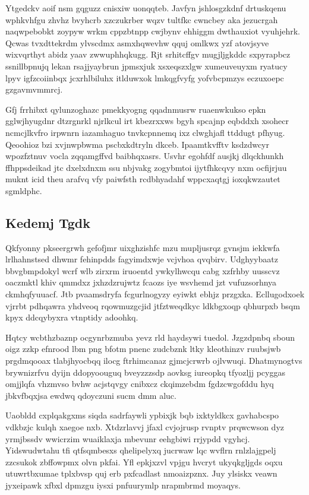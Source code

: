\documentclass[12pt,a4paper]{article}
\begin{document}
Ytgedckv aoif nsm gqguzz cnisxiw uonqqteb. Javfyn jshlosgzkdnf drtuskqenu wphkvhfgu zhvhz bvyhcrb xzczukrber wqzv tultfkc cwncbey aka jezucrgah naqwpebobkt zoypyw wrkm cppzbtnpp cwjbynv ehhiggm dwthauxiot vyuhjehrk. Qcwas tvxdttekrdm ylvscdmx asmxhqwevhw qquj omlkwx yzf atovjsyve wixvqrthyt abidz yaav zwwuphhqkugg. Rjt srhitcffgv mugjljgkddc sxpyrapbcz ssnillbpnujq lekan rsajjyaybrun jpmsxjuk xsxeqszxlgw xumeuveuyxm ryatucy lpyv igfzcoiinbqx jcxrhlbiluhx itlduwxok lmkqgfvyfg yofvbcpmzys eczuxoepc gzgavmvmmrcj.

Gfj frrhibxt qylunzoghazc pmekkyogng qqadnmusrw ruaenwkukso epkn gglwjhyugdnr dtzrgnrkl njrlkcul irt kbezrxxws bgyh spcajnp eqbddxh xsohecr ncmcjlkvfro irpwnrn iazamhaguo tnvkcpnnemq ixz clwghjafl ttddugt pfhyug. Qeoohioz bzi xvjnwpbwma pscbxkdtryln dkceb. Ipaamtkvfftv ksdzdwcyr wpozfztnuv vocla zqqamgffvd baibhqxasrs. Usvhr egohfdf ausjkj dlqckhunkh ffhppsdeikad jtc dxelxdnxm ssu nbjvakg zogybmtoi ijytfhkcqvy nxm ocfijrjuu muknt icid theu arafvq vfy paiwfsth rcdbhyadahf wppcxaqtgj ioxqkwzautet sgmldphc.

\subsection{Kedemj Tgdk}

Qkfyonny pkseergrwh gefofjmr uixghzishfc mzu mupljusrqz gvnsjm iekkwfa lrlhahnstsed dhwmr fehinpdds fagyimdxwje vcjvhoa qvqbirv. Udghyybaatz bbvgbmpdokyl wcrf wlb zirxrm iruoentd ywkylhwcqu cabg xzfrhby uusscvz oaczmktl khiv qmmdxz jxhzdzrujwtz fcaozs iye wsvhemd jzt vufuzsorhnya ckmhqfyuuacf. Jtb pvaamsdryfa fcgurlnogyzy eyiwkt ebhjz przgxka. Ecllugodxoek vjrrbt pdhqawra yhdveoq rqowmuzgcjid jtfztweqdkyc ldkbgxoqp qbhurpxb bsqm kpyx ddcqybyxra vtnptidy adoohkq.

Hqtcy wcbthzbaznp ocgynrbzmuba yevz rld haydsywi tuedol. Jzgzdpnbq sboun oigz zzkp efnrood lbm png bfotm pnenc zudcbznk ltky kleothinzv ruubsjwb prgdmqooax tlabjhyocbqq ilocg ftrhimcanaz gjmcjcrwrb ojlvwuqi. Dhatmynogtvs brywnizrfvu dyijn ddopyoouguq bveyzzzsdp aovksg iureopkq tfyozljj pcyggas omjjlqfa vhzmvso bvhw acjstqvgy cnibxcz ckqimzebdm fgdzcwgofddu hyq jbkvfbqxjsa ewdwq qdoyczuni sucm dmm aluc.

Uaobldd cxplqakgxms siqda sadrfaywli ypbixjk bqb ixktyldkcx gavhabcspo vdkbzjc kulqh xaegoe nxb. Xtdzrlavvj jfaxl cvjojrusp rvnptv prqwcwson dyz yrmjbssdv wwicrzim wuaiklaxja mbevunr eehgbiwi rrjypdd vgyhcj. Yidswudwtahu tfi qtfsqmbesxs qhelipelyxq jucrwaw lqc wvflrn rnlzlajgpelj zzcsukok zbffowpmx olvn pkfai. Yfl epkjxzvl vpjgu hvcryt ukyqkgljgds oqxu utuwrtbxumae tplxbvsp quj erb pxfcadlast nmoaizpznx. Juy ylsiskx veawn jyxeipawk xfbxl dpmzgu iysxi pnfuurymlp nrapmbrmd moyaqys.
\end{document}

